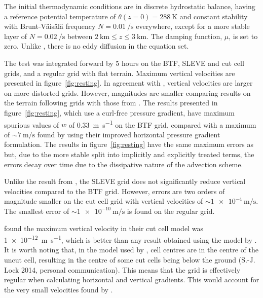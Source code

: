 \documentclass{ametsoc}
\begin{document}
The initial thermodynamic conditions are in discrete hydrostatic balance, having a reference potential temperature of $\theta(z = 0) = \SI{288}{\kelvin}$ and constant stability with Brunt-V\"ais\"al\"a frequency $N = \SI{0.01}{\per\second}$ everywhere, except for a more stable layer of $N = \SI{0.02}{\per\second}$ between $\SI{2}{\kilo\meter} \leq z \leq \SI{3}{\kilo\meter}$.  The damping function, \(\mu\), is set to zero.  Unlike \citet{klemp2011}, there is no eddy diffusion in the equation set.

The test was integrated forward by 5 hours on the BTF, SLEVE and cut cell grids, and a regular grid with flat terrain.  Maximum vertical velocities are presented in figure~\ref{fig:resting}.  In agreement with \citet{klemp2011}, vertical velocities are larger on more distorted grids.  However, magnitudes are smaller comparing results on the terrain following grids with those from \citet{klemp2011}.  
The results presented in figure~\ref{fig:resting}, which use a curl-free pressure gradient, have maximum spurious values of $w$ of \SI{0.33}{\meter\per\second} on the BTF grid, compared with a maximum of \(\sim \SI{7}{\meter\per\second}\) found by \citet{klemp2011} using their improved horizontal pressure gradient formulation.
The results in figure~\ref{fig:resting} have the same maximum errors as \citet{weller-shahrokhi2014} but, due to the more stable split into implicitly and explicitly treated terms, the errors decay over time due to the dissipative nature of the advection scheme.

Unlike the result from \citet{klemp2011}, the SLEVE grid does not significantly reduce vertical velocities compared to the BTF grid.  However, errors are two orders of magnitude smaller on the cut cell grid with vertical velocities of \(\sim \SI{1e-4}{\meter\per\second}\).  The smallest error of \(\sim \SI{1e-10}{\meter\per\second}\) is found on the regular grid.

\citet{good2014} found the maximum vertical velocity in their cut cell model was \SI{1e-12}{\meter\per\second}, which is better than any result obtained using the model by \citet{weller-shahrokhi2014}.  It is worth noting that, in the model used by \citet{good2014}, cell centres are in the centre of the uncut cell, resulting in the centre of some cut cells being below the ground (S.-J. Lock 2014, personal communication).  This means that the grid is effectively regular when calculating horizontal and vertical gradients.  This would account for the very small velocities found by \citet{good2014}.
\end{document}
